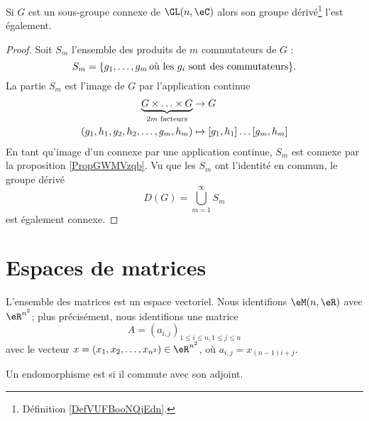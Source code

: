 \begin{lemma}
    Si \( G\) est un sous-groupe connexe de \( \GL(n,\eC)\) alors son groupe dérivé\footnote{Définition \ref{DefVUFBooNQjEdn}.} l'est également.
\end{lemma}

\begin{proof}
    Soit \( S_m\) l'ensemble des produits de \( m\) commutateurs de \( G\) :
    \begin{equation}
        S_m=\{ g_1,\ldots, g_m\,\text{où les \( g_i\) sont des commutateurs} \}.
    \end{equation}
    La partie \( S_m\) est l'image de \( G\) par l'application continue
    \begin{equation}
        \begin{aligned}
            \underbrace{G\times \ldots\times G}_{\text{\( 2m\) facteurs}}&\to G \\
            (g_1,h_1,g_2,h_2,\ldots, g_m,h_m)&\mapsto [g_1,h_1]\ldots [g_m,h_m] 
        \end{aligned}
    \end{equation}
    En tant qu'image d'un connexe par une application continue, \( S_m\) est connexe par la proposition \ref{PropGWMVzqb}. Vu que les \( S_m\) ont l'identité en commun, le groupe dérivé
    \begin{equation}
        D(G)=\bigcup_{m=1}^{\infty}S_m
    \end{equation}
    est également connexe.
\end{proof}

\section{Espaces de matrices}

L'ensemble des matrices est un espace vectoriel. Nous identifions $\eM(n,\eR)$ avec $ \eR^{n^2}$; plus précisément, nous identifions une matrice 
\begin{equation}
    A = (a_{i,j})_{1\leq i \leq n, 1 \leq j \leq n}
\end{equation}
avec le vecteur $x = (x_1, x_2, \dots, x_{n^2}) \in \eR^{n^2}$, où $ a_{i,j} = x_{(n-1)i + j}$. 

\begin{definition}  \label{DefWQNooKEeJzv}
    Un endomorphisme est  si il commute avec son adjoint.
\end{definition}

